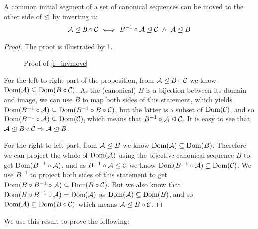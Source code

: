 \newcommand{\ia}{\sqs{A}}
\newcommand{\ic}{\sqs{C}}
\newcommand{\ibi}{B^{-1}}

\begin{mylem}
A common initial segment of a set of canonical sequences can be moved 
to the other side of $\trianglelefteq$ by inverting it:
\begin{gather*}
\worksm{\ia}{B\cc\ic}
\ \Longleftrightarrow \ \worksm{\ibi\cc\ia}{\ic} 
\ \wedge \  \worksm{\ia}{B}
\end{gather*}
\end{mylem}
\begin{proof}

The proof is illustrated by \cref{fig_invmove}.

\begin{figure}[htb]

\caption{Proof of \cref{r_invmove}}\label{fig_invmove}
\end{figure}

For the left-to-right part of the proposition,
from $\worksm{\ia}{B\cc\ic}$ we know $\Dom{\ia} \subseteq \Dom{B\cc\ic}$.
As the (canonical) $B$ is a bijection between its domain and image,
we can use $B$ to map both sides of this statement, which yields
$\Dom{B^{-1}\cc\ia} \subseteq \Dom{\ibi\cc B\cc\ic}$,
but the latter is a subset of $\Dom{\ic}$,
and so $\Dom{\ibi\cc\ia} \subseteq \Dom{\ic}$,
which means that $\worksm{\ibi\cc\ia}{\ic}$.
It is easy to see that $\worksm{\ia}{B\cc\ic} \Rightarrow \worksm{\ia}{B}$.

For the right-to-left part,
from $\worksm{\ia}{B}$ we know $\Dom{\ia} \subseteq \Dom{B}$.
Therefore we can project the whole of $\Dom{\ia}$ using the bijective canonical sequence $B$
to get $\Dom{\ibi\cc\ia}$, and as $\worksm{\ibi\cc\ia}{\ic}$
we know
$\Dom{\ibi\cc\ia} \subseteq \Dom{\ic}$.
We use $\ibi$ to project both sides of this statement to get
$\Dom{B\cc\ibi\cc\ia} \subseteq \Dom{B\cc\ic}$.
But we also know that $\Dom{B\cc\ibi\cc\ia} = \Dom{\ia}$
as $\Dom{\ia} \subseteq \Dom{B}$,
and so $\Dom{\ia} \subseteq \Dom{B\cc\ic}$ which means
$\worksm{\ia}{B\cc\ic}$.
\end{proof}

We use this result to prove the following:

